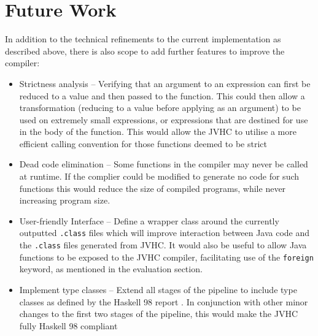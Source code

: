 \documentclass[float=false, crop=false]{standalone}
\begin{document}
\section{Future Work}

In addition to the technical refinements to the current implementation as described above, there is also scope to add further features to improve the compiler:


\begin{itemize}
  \item Strictness analysis -- Verifying that an argument to an
    expression can first be reduced to a value and then passed
    to the function. This could then allow a transformation 
    (reducing to a value before applying as an argument) to be used 
    on extremely small expressions, or expressions that are destined for use in the body of the function. This would allow the JVHC to utilise a more efficient calling convention for those functions deemed to be strict

  \item Dead code elimination -- Some functions in the compiler may never
    be called at runtime. 
    If the complier could be modified to generate no code for such functions this would
    reduce the size of compiled programs, while never
    increasing program size.

  \item User-friendly Interface -- Define a wrapper class
    around the currently outputted \verb|.class| files
    which will improve interaction between Java code and the
    \verb|.class| files generated from JVHC. It would also
    be useful to allow Java functions to be exposed to the JVHC 
    compiler, facilitating use of the \verb|foreign| keyword, 
    as mentioned in the evaluation section.

  \item Implement type classes -- Extend all stages of the pipeline to 
    include type classes as defined by the Haskell 98 report 
    \cite{haskell98-spec}. In conjunction with other minor changes to the first two stages of the pipeline, this would make the JVHC fully Haskell 98 compliant

\end{itemize}
\end{document}
